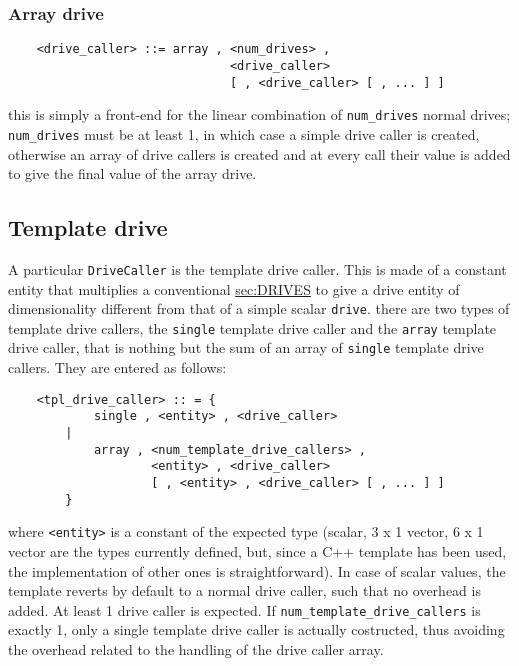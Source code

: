\subsubsection{Array drive}
\begin{verbatim}
    <drive_caller> ::= array , <num_drives> ,
                               <drive_caller> 
                               [ , <drive_caller> [ , ... ] ]
\end{verbatim}
this is simply a front-end for the linear combination of \texttt{num\_drives} 
normal drives; \texttt{num\_drives} must be at least 1, in which case 
a simple drive caller is created, otherwise an array of drive callers 
is created and at every call their value is added to give 
the final value of the array drive.


\subsection{Template drive}\label{sec:TPL-DRIVES}
A particular \texttt{DriveCaller} is the template drive caller. This is made
of a constant entity that multiplies a conventional 
\hyperref{\texttt{drive}}{\texttt{drive} (see Section~}{)}{sec:DRIVES} to give a drive
entity of dimensionality different from that of a simple scalar \texttt{drive}.
there are two types of template drive callers, the \texttt{single} template 
drive caller and the \texttt{array} template drive caller, 
that is nothing but the sum of an array of \texttt{single}
template drive callers. 
They are entered as follows:
\begin{verbatim}
    <tpl_drive_caller> :: = {
            single , <entity> , <drive_caller> 
        |
            array , <num_template_drive_callers> ,
                    <entity> , <drive_caller>
                    [ , <entity> , <drive_caller> [ , ... ] ]
        }
\end{verbatim}
where \texttt{<entity>} is a constant of the expected type (scalar, 3 x 1 vector,
6 x 1 vector are the types currently defined, but, since a C++ template has
been used, the implementation of other ones is straightforward). In case of
scalar values, the template reverts by default to a normal drive caller,
such that no overhead is added.
At least 1 drive caller is expected. 
If \texttt{num\_template\_drive\_callers} is exactly 1, only a single
template drive caller is actually costructed, thus avoiding the overhead 
related to the handling of the drive caller array.    



